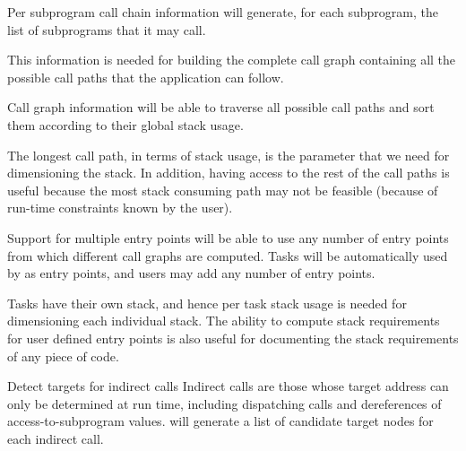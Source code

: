 \begin{requirement}{Per subprogram call chain information}
  \ssat{} will generate, for each subprogram, the list of subprograms
  that it may call.
\end{requirement}

\begin{rationale}
  This information is needed for building the complete call graph
  containing all the possible call paths that the application can
  follow.
\end{rationale}

\begin{requirement}{Call graph information}
  \ssat{} will be able to traverse all possible call paths and sort
  them according to their global stack usage.
\end{requirement}

\begin{rationale}
  The longest call path, in terms of stack usage, is the parameter
  that we need for dimensioning the stack. In addition, having access
  to the rest of the call paths is useful because the most stack
  consuming path may not be feasible (because of run-time constraints
  known by the user).
\end{rationale}

\begin{requirement}{Support for multiple entry points}
  \ssat{} will be able to use any number of entry points from which
  different call graphs are computed. Tasks will be automatically used
  by \ssat{} as entry points, and users may add any number of entry
  points.
\end{requirement}

\begin{rationale}
  Tasks have their own stack, and hence per task stack usage is needed
  for dimensioning each individual stack. The ability to compute stack
  requirements for user defined entry points is also useful for
  documenting the stack requirements of any piece of code.
\end{rationale}

\begin{requirement}{Detect targets for indirect calls}
  Indirect calls are those whose target address can only be determined
  at run time, including dispatching calls and dereferences of
  access-to-subprogram values. \ssat{} will generate a list of
  candidate target nodes for each indirect call.
\end{requirement}

